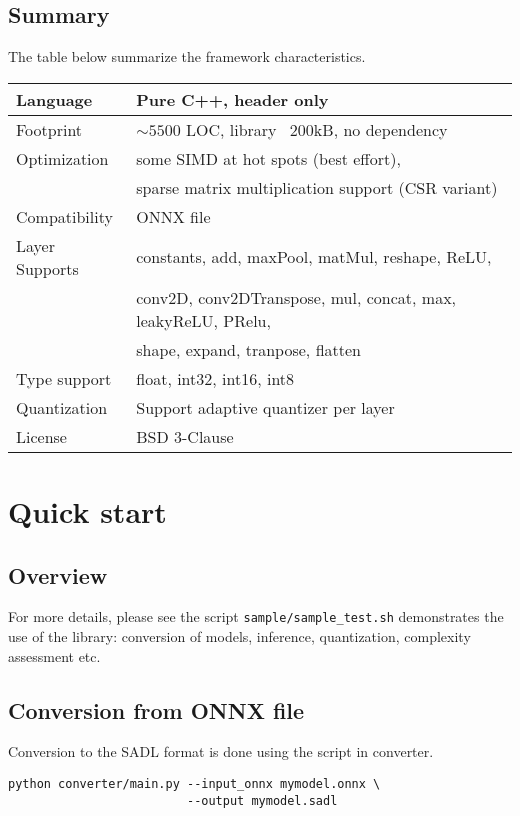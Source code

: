 \documentclass[10pt,a4paper]{article}
\begin{document}
\subsection{Summary}
The table below summarize the framework characteristics.
\begin{table}[]
\begin{tabular}{|l|l|}
\hline
Language & Pure C++, header only \\
\hline
Footprint & $\sim 5500$ LOC, library ~200kB, no dependency\\
\hline
Optimization & some SIMD at hot spots (best effort), \\
& sparse matrix multiplication support (CSR variant)\\
\hline
Compatibility & ONNX file\\
\hline
Layer Supports & constants, add, maxPool, matMul, reshape, ReLU, \\
& conv2D, conv2DTranspose, mul, concat, max, leakyReLU, PRelu, \\
& shape, expand, tranpose, flatten \\
\hline
Type support & float, int32, int16, int8\\
\hline
Quantization & Support adaptive quantizer per layer\\
\hline
License & BSD 3-Clause \\
\hline
\end{tabular}
\end{table}


\section{Quick start}

\subsection{Overview}
For more details, please see the script \texttt{sample/sample\_test.sh} demonstrates the use of the library: conversion of models, inference, quantization, complexity assessment etc.


\subsection{Conversion from ONNX file}
Conversion to the SADL format is done using the script in converter.
\begin{lstlisting}[caption={SADL format conversion},style=code]
python converter/main.py --input_onnx mymodel.onnx \
                         --output mymodel.sadl
\end{lstlisting}
\end{document}
